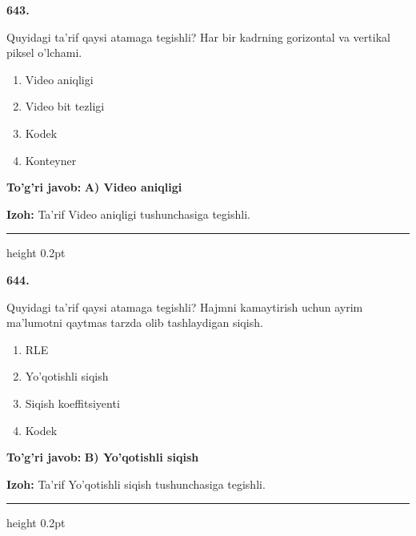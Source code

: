 \documentclass[10pt,a4paper,oneside]{article}
\begin{document}
\noindent\textbf{\color{ink}643.}
\par
Quyidagi ta'rif qaysi atamaga tegishli? Har bir kadrning gorizontal va vertikal piksel o'lchami.
\begin{enumerate}[label=\Alph*),leftmargin=9mm]
\item Video aniqligi
\item Video bit tezligi
\item Kodek
\item Konteyner
\end{enumerate}
\begin{tcolorbox}[enhanced,breakable,colback=teal!4,colframe=teal!50!black,boxrule=0.5pt,arc=1.1mm,left=3mm,right=3mm,top=1.7mm,bottom=1.7mm,before skip=2mm,after skip=2mm]
\textbf{\color{teal}To'g'ri javob:} \textbf{A) Video aniqligi}
\par\smallskip
\textbf{Izoh:} Ta'rif Video aniqligi tushunchasiga tegishli.
\end{tcolorbox}
\vspace{2mm}\hrule height 0.2pt \vspace{3mm}

\noindent\textbf{\color{ink}644.}
\par
Quyidagi ta'rif qaysi atamaga tegishli? Hajmni kamaytirish uchun ayrim ma'lumotni qaytmas tarzda olib tashlaydigan siqish.
\begin{enumerate}[label=\Alph*),leftmargin=9mm]
\item RLE
\item Yo'qotishli siqish
\item Siqish koeffitsiyenti
\item Kodek
\end{enumerate}
\begin{tcolorbox}[enhanced,breakable,colback=teal!4,colframe=teal!50!black,boxrule=0.5pt,arc=1.1mm,left=3mm,right=3mm,top=1.7mm,bottom=1.7mm,before skip=2mm,after skip=2mm]
\textbf{\color{teal}To'g'ri javob:} \textbf{B) Yo'qotishli siqish}
\par\smallskip
\textbf{Izoh:} Ta'rif Yo'qotishli siqish tushunchasiga tegishli.
\end{tcolorbox}
\vspace{2mm}\hrule height 0.2pt \vspace{3mm}
\end{document}
